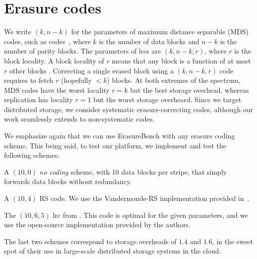 \section{Erasure codes}

\label{sec:codes}

We write $(k,n-k)$ for the parameters of maximum distance separable (MDS) codes, such as  codes~\autocite{reed-solomon}, where $k$ is the number of data blocks and $n-k$ is the number of parity blocks. The parameters of \acp{lrc} are  $(k,n-k,r)$, where $r$ is the block locality. A block locality of $r$ means that any block is a function of at most $r$ other blocks \autocite{XorbasVLDB}. Correcting a single erased block using a $(k,n-k,r)$ code requires to fetch $r$ (hopefully $<k$) blocks. At both extremes of the spectrum, MDS codes have the worst locality $r=k$ but the best storage overhead, whereas replication has locality $r=1$ but the worst storage overheard. Since we target distributed storage, we consider systematic erasure-correcting codes, although our work seamlessly extends to non-systematic codes. %

We emphasize again that we can use ErasureBench with any erasure coding scheme. This being said, to test our platform, we implement and test the following schemes:
\begin{description}
\item[\textbf{NC}] A $(10,0)$ \emph{no coding} scheme, with 10 data blocks per stripe, that simply forwards data blocks without redundancy. 
\item[\textbf{\acs{rs}}] A $(10,4)$ RS code. We use the Vandermonde-RS implementation provided in~\autocite{XorbasVLDB}.  
\item[\textbf{\acs{lrc}}] The $(10,6,5)$ \acs{lrc} from \autocite{XorbasVLDB}. This code is optimal for the given parameters, and we use the open-source implementation provided by the authors.
\end{description}
The last two schemes correspond to storage overheads of $1.4$ and $1.6$, in the sweet spot of their use in large-scale distributed storage systems in the cloud.
